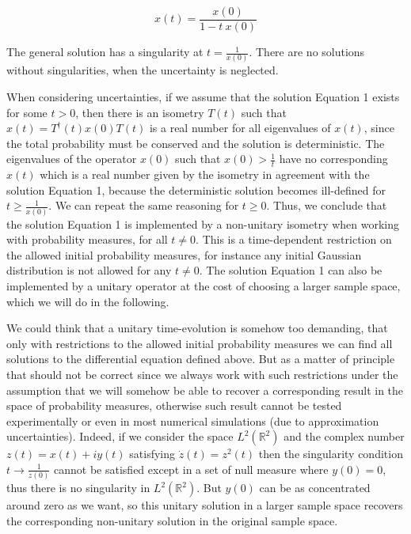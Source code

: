 \documentclass[11pt]{book}
\begin{document}
\begin{equation}x(t)=\frac{x(0)}{1-t\ x(0)}\end{equation}

The general solution has a singularity at \(t=\frac{1}{x(0)}\). There
are no solutions without singularities, when the uncertainty is
neglected\cite{GORIELY2000422}.

When considering uncertainties, if we assume that the solution
Equation 1 exists for some \(t>0\),
then there is an isometry \(T(t)\) such that
\(x(t)=T^\dagger(t)x(0)T(t)\) is a real number for all eigenvalues of
\(x(t)\), since the total probability must be conserved and the solution
is deterministic. The eigenvalues of the operator \(x(0)\) such that
\(x(0)>\frac{1}{t}\) have no corresponding \(x(t)\) which is a real
number given by the isometry in agreement with the solution
Equation 1, because the deterministic
solution becomes ill-defined for \(t\geq\frac{1}{x(0)}\). We can repeat
the same reasoning for \(t\geq 0\). Thus, we conclude that the solution
Equation 1 is implemented by a
non-unitary isometry when working with probability measures, for all
\(t\neq 0\). This is a time-dependent restriction on the allowed initial
probability measures, for instance any initial Gaussian distribution is
not allowed for any \(t\neq 0\). The solution
Equation 1 can also be implemented by a
unitary operator at the cost of choosing a larger sample space, which we
will do in the following.

We could think that a unitary time-evolution is somehow too demanding,
that only with restrictions to the allowed initial probability measures
we can find all solutions to the differential equation defined above.
But as a matter of principle that should not be correct since we always
work with such restrictions under the assumption that we will somehow be
able to recover a corresponding result in the space of probability
measures, otherwise such result cannot be tested experimentally or even
in most numerical simulations (due to approximation uncertainties).
Indeed, if we consider the space \(L^2(\mathbb{R}^2)\) and the complex
number \(z(t)=x(t)+iy(t)\) satisfying \(\dot{z}(t)=z^2(t)\) then the
singularity condition \(t\to\frac{1}{z(0)}\) cannot be satisfied except
in a set of null measure where \(y(0)=0\), thus there is no singularity
in \(L^2(\mathbb{R}^2)\). But \(y(0)\) can be as concentrated around
zero as we want, so this unitary solution in a larger sample space
recovers the corresponding non-unitary solution in the original sample
space.
\end{document}
